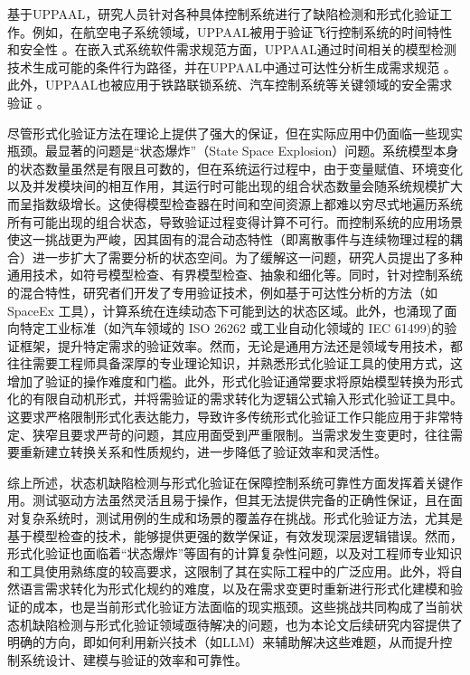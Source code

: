 基于UPPAAL，研究人员针对各种具体控制系统进行了缺陷检测和形式化验证工作。例如，在航空电子系统领域，UPPAAL被用于验证飞行控制系统的时间特性和安全性 。在嵌入式系统软件需求规范方面，UPPAAL通过时间相关的模型检测技术生成可能的条件行为路径，并在UPPAAL中通过可达性分析生成需求规范 。此外，UPPAAL也被应用于铁路联锁系统、汽车控制系统等关键领域的安全需求验证 。

尽管形式化验证方法在理论上提供了强大的保证，但在实际应用中仍面临一些现实瓶颈。最显著的问题是“状态爆炸”（State Space Explosion）问题。系统模型本身的状态数量虽然是有限且可数的，但在系统运行过程中，由于变量赋值、环境变化以及并发模块间的相互作用，其运行时可能出现的组合状态数量会随系统规模扩大而呈指数级增长。这使得模型检查器在时间和空间资源上都难以穷尽式地遍历系统所有可能出现的组合状态，导致验证过程变得计算不可行。而控制系统的应用场景使这一挑战更为严峻，因其固有的混合动态特性（即离散事件与连续物理过程的耦合）进一步扩大了需要分析的状态空间。为了缓解这一问题，研究人员提出了多种通用技术，如符号模型检查、有界模型检查、抽象和细化等。同时，针对控制系统的混合特性，研究者们开发了专用验证技术，例如基于可达性分析的方法（如 SpaceEx 工具），计算系统在连续动态下可能到达的状态区域。此外，也涌现了面向特定工业标准（如汽车领域的 ISO 26262 或工业自动化领域的 IEC 61499)的验证框架，提升特定需求的验证效率。然而，无论是通用方法还是领域专用技术，都往往需要工程师具备深厚的专业理论知识，并熟悉形式化验证工具的使用方式，这增加了验证的操作难度和门槛。此外，形式化验证通常要求将原始模型转换为形式化的有限自动机形式，并将需验证的需求转化为逻辑公式输入形式化验证工具中。这要求严格限制形式化表达能力，导致许多传统形式化验证工作只能应用于非常特定、狭窄且要求严苛的问题，其应用面受到严重限制。当需求发生变更时，往往需要重新建立转换关系和性质规约，进一步降低了验证效率和灵活性。

综上所述，状态机缺陷检测与形式化验证在保障控制系统可靠性方面发挥着关键作用。测试驱动方法虽然灵活且易于操作，但其无法提供完备的正确性保证，且在面对复杂系统时，测试用例的生成和场景的覆盖存在挑战。形式化验证方法，尤其是基于模型检查的技术，能够提供更强的数学保证，有效发现深层逻辑错误。然而，形式化验证也面临着“状态爆炸”等固有的计算复杂性问题，以及对工程师专业知识和工具使用熟练度的较高要求，这限制了其在实际工程中的广泛应用。此外，将自然语言需求转化为形式化规约的难度，以及在需求变更时重新进行形式化建模和验证的成本，也是当前形式化验证方法面临的现实瓶颈。这些挑战共同构成了当前状态机缺陷检测与形式化验证领域亟待解决的问题，也为本论文后续研究内容提供了明确的方向，即如何利用新兴技术（如LLM）来辅助解决这些难题，从而提升控制系统设计、建模与验证的效率和可靠性。

